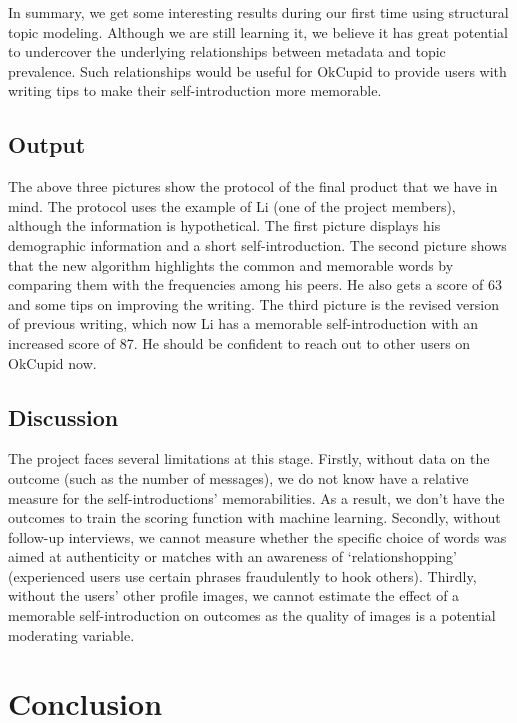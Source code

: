 \documentclass[]{article}
\begin{document}
In summary, we get some interesting results during our first time using
structural topic modeling. Although we are still learning it, we believe
it has great potential to undercover the underlying relationships
between metadata and topic prevalence. Such relationships would be
useful for OkCupid to provide users with writing tips to make their
self-introduction more memorable.

\hypertarget{output}{%
\subsection{Output}\label{output}}

The above three pictures show the protocol of the final product that we
have in mind. The protocol uses the example of Li (one of the project
members), although the information is hypothetical. The first picture
displays his demographic information and a short self-introduction. The
second picture shows that the new algorithm highlights the common and
memorable words by comparing them with the frequencies among his peers.
He also gets a score of 63 and some tips on improving the writing. The
third picture is the revised version of previous writing, which now Li
has a memorable self-introduction with an increased score of 87. He
should be confident to reach out to other users on OkCupid now.

\hypertarget{discussion}{%
\subsection{Discussion}\label{discussion}}

The project faces several limitations at this stage. Firstly, without
data on the outcome (such as the number of messages), we do not know
have a relative measure for the self-introductions' memorabilities. As a
result, we don't have the outcomes to train the scoring function with
machine learning. Secondly, without follow-up interviews, we cannot
measure whether the specific choice of words was aimed at authenticity
or matches with an awareness of `relationshopping' (experienced users
use certain phrases fraudulently to hook others). Thirdly, without the
users' other profile images, we cannot estimate the effect of a
memorable self-introduction on outcomes as the quality of images is a
potential moderating variable.

\hypertarget{conclusion}{%
\section{Conclusion}\label{conclusion}}
\end{document}
